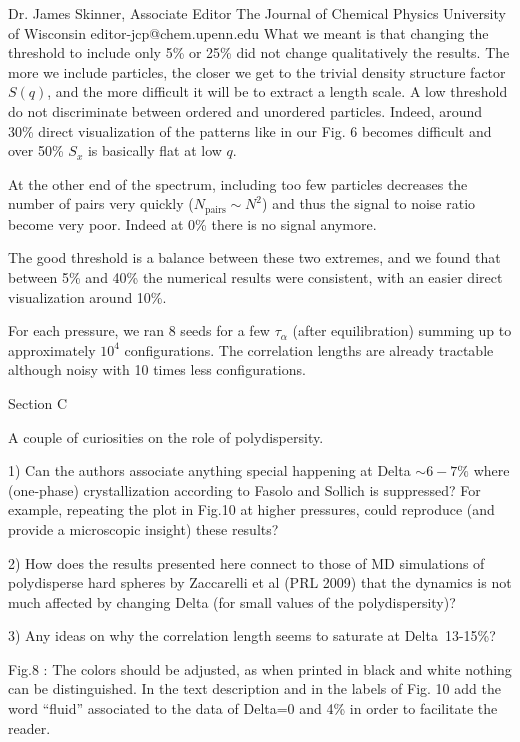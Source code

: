 \documentclass[a4paper, rebuttal, parskip=true, firsthead=false, fromemail=true, foldmarks=false]{scrlttr2}
\begin{document}
\begin{letter}{Dr. James Skinner, Associate Editor
The Journal of Chemical Physics
University of Wisconsin
editor-jcp@chem.upenn.edu }
What we meant is that changing the threshold to include only 5\% or 25\% did not change qualitatively the results. The more we include particles, the closer we get to the trivial density structure factor $S(q)$, and the more difficult it will be to extract a length scale. A low threshold do not discriminate between ordered and unordered particles. Indeed, around 30\% direct visualization of the patterns like in our Fig. 6 becomes difficult and over 50\% $S_x$ is basically flat at low $q$. 

At the other end of the spectrum, including too few particles decreases the number of pairs very quickly ($N_\text{pairs}\sim N^2$) and thus the signal to noise ratio become very poor. Indeed at 0\% there is no signal anymore.

The good threshold is a balance between these two extremes, and we found that between 5\% and 40\% the numerical results were consistent, with an easier direct visualization around 10\%.

For each pressure, we ran 8 seeds for a few $\tau_\alpha$ (after equilibration) summing up to approximately $10^4$ configurations. The correlation lengths are already tractable although noisy with 10 times less configurations.

\begin{quotationi}
Section C

A couple of curiosities on the role of polydispersity.

1) Can the authors associate anything special happening at Delta $\sim6-7\%$ where (one-phase) crystallization according to Fasolo and Sollich is suppressed? For example, repeating the plot in Fig.10 at higher pressures, could reproduce (and provide a microscopic insight) these results?
\end{quotationi}

\begin{quotationi}
2) How does the results presented here connect to those of MD simulations of polydisperse hard spheres by Zaccarelli et al (PRL 2009) that the dynamics is not much affected by changing Delta (for small values of the polydispersity)?
\end{quotationi}

\begin{quotationi}
3) Any ideas on why the correlation length seems to saturate at Delta~13-15\%?
\end{quotationi}

\begin{quotationi}
Fig.8 : The colors should be adjusted, as when printed in black and white nothing can be distinguished.
In the text description and in the labels of Fig. 10 add the word ``fluid'' associated to the data of Delta=0 and 4\% in order to facilitate the reader.
\end{quotationi}


\end{letter}
\end{document}
